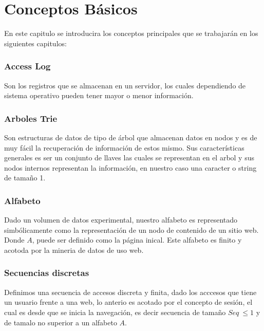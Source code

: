 \chapter[Conceptos Básicos]{Conceptos Básicos}
\label{ch:Conceptos-Basicos}





En este capitulo se introducira los conceptos principales que se trabajarán en los siguientes capitulos:




\subsection{Access Log}

Son los registros que se almacenan en un servidor, los cuales dependiendo de sistema operativo pueden tener mayor o menor información.



\subsection{Arboles Trie}


Son estructuras de datos de tipo de árbol que almacenan datos en nodos y es de muy fácil la recuperación de información de estos mismo. Sus características generales es ser un conjunto de llaves las cuales se representan en el arbol y sus nodos internos representan la información, en nuestro caso una caracter o string de tamaño 1.




\subsection{Alfabeto}

Dado un volumen de datos experimental, nuestro alfabeto es representado simbólicamente como la representación de un nodo de contenido de un sitio web.
Donde $A $, puede ser definido como la página inical. Este alfabeto es finito y acotoda por la mineria de datos de uso web.




\subsection{Secuencias discretas}

Definimos una secuencia de accesos discreta y finita, dado los acccesos que tiene un usuario frente a una web, lo anterio es acotado por el concepto de sesión, el cual es desde que se inicia la navegación, es decir secuencia de tamaño $Seq\ \leq 1$ y de tamalo no superior a un alfabeto $A$.


